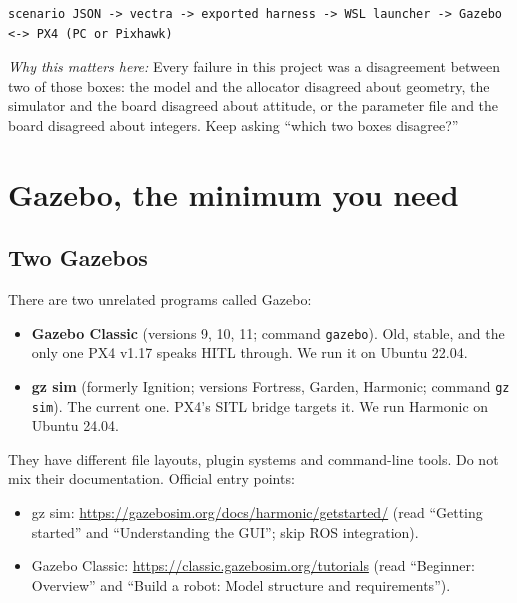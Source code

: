 \documentclass[11pt,a4paper]{article}
\newcommand{\file}[1]{\texttt{#1}}
\newcommand{\why}[1]{\par\smallskip\noindent\textit{Why this matters here:} #1\par}
\begin{document}
\begin{lstlisting}
scenario JSON -> vectra -> exported harness -> WSL launcher -> Gazebo <-> PX4 (PC or Pixhawk)
\end{lstlisting}

\why{Every failure in this project was a disagreement between two of those boxes: the model and
the allocator disagreed about geometry, the simulator and the board disagreed about attitude, or
the parameter file and the board disagreed about integers. Keep asking ``which two boxes disagree?''}

\section{Gazebo, the minimum you need}

\subsection{Two Gazebos}
There are two unrelated programs called Gazebo:
\begin{itemize}
  \item \textbf{Gazebo Classic} (versions 9, 10, 11; command \file{gazebo}). Old, stable, and the
        only one PX4 v1.17 speaks HITL through. We run it on Ubuntu 22.04.
  \item \textbf{gz sim} (formerly Ignition; versions Fortress, Garden, Harmonic; command \file{gz sim}).
        The current one. PX4's SITL bridge targets it. We run Harmonic on Ubuntu 24.04.
\end{itemize}
They have different file layouts, plugin systems and command-line tools. Do not mix their
documentation. Official entry points:
\begin{itemize}
  \item gz sim: \url{https://gazebosim.org/docs/harmonic/getstarted/} (read ``Getting started'' and
        ``Understanding the GUI''; skip ROS integration).
  \item Gazebo Classic: \url{https://classic.gazebosim.org/tutorials} (read ``Beginner: Overview'' and
        ``Build a robot: Model structure and requirements'').
\end{itemize}
\end{document}
